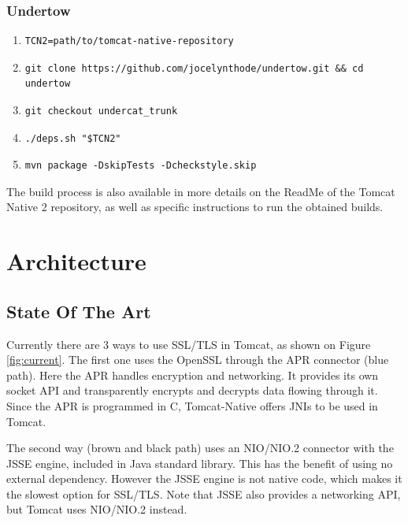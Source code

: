 \documentclass[11pt,a4paper,bibliography=totocnumbered]{scrartcl}
\def\mytitle{Tomcat Native 2}
\begin{document}
\subsubsection{Undertow}
\begin{enumerate}
	\item \begin{verbatim}TCN2=path/to/tomcat-native-repository\end{verbatim}
	\item \begin{verbatim}git clone https://github.com/jocelynthode/undertow.git && cd undertow\end{verbatim}
	\item \begin{verbatim}git checkout undercat_trunk\end{verbatim}
	\item \begin{verbatim}./deps.sh "$TCN2"\end{verbatim}
	\item \begin{verbatim}mvn package -DskipTests -Dcheckstyle.skip\end{verbatim}
\end{enumerate}
The build process is also available in more details on the ReadMe of the \mytitle{} repository, as well as specific instructions to run the obtained builds.

\section{Architecture}
\label{sec:architecture}
\subsection{State Of The Art}
Currently there are 3 ways to use SSL/TLS in Tomcat, as shown on Figure \ref{fig:current}. The first one uses the OpenSSL through the APR connector (blue path). Here the APR handles encryption and networking. It provides its own socket API and transparently encrypts and decrypts data flowing through it. Since the APR is programmed in C, Tomcat-Native offers JNIs to be used in Tomcat.

The second way (brown and black path) uses an NIO/NIO.2 connector with the JSSE engine, included in Java standard library. This has the benefit of using no external dependency. However the JSSE engine is not native code, which makes it the slowest option for SSL/TLS. Note that JSSE also provides a networking API, but Tomcat uses NIO/NIO.2 instead.
\end{document}
